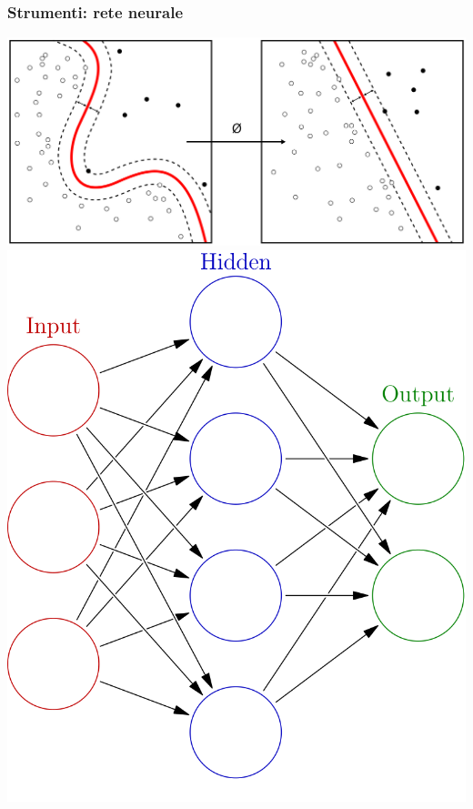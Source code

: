 \documentclass[xcolor=svgnames]{beamer}
\begin{document}
\begin{frame}\small\frametitle{Strumenti: rete neurale}

  \includegraphics[width=.5\textwidth]{pictures/kernel-machine.png} \hfill \includegraphics[height=.5\textheight]{pictures/neural-network.png}


\end{frame}
\end{document}
